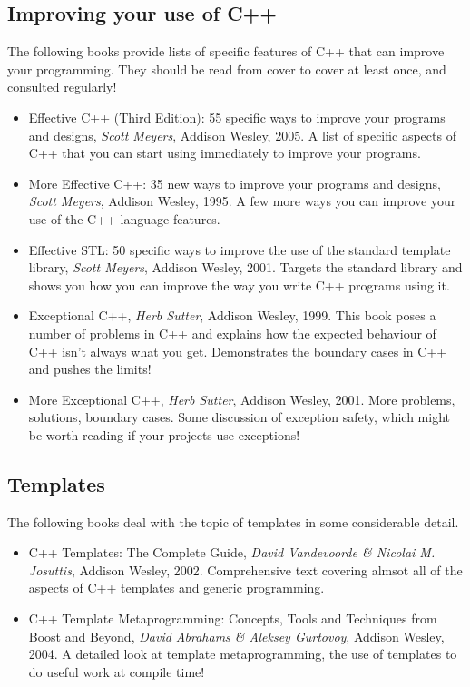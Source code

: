 \documentclass[a4paper]{scrartcl}
\begin{document}
\subsection{Improving your use of C++}
The following books provide lists of specific features of C++ that can improve your programming. They should be read from cover to cover at least once, and consulted regularly!

\begin{itemize}
	\item Effective C++ (Third Edition): 55 specific ways to improve your programs and designs, \emph{Scott Meyers}, Addison Wesley, 2005. A list of specific aspects of C++ that you can start using immediately to improve your programs.
	\item More Effective C++: 35 new ways to improve your programs and designs, \emph{Scott Meyers}, Addison Wesley, 1995. A few more ways you can improve your use of the C++ language features.
	\item Effective STL: 50 specific ways to improve the use of the standard template library, \emph{Scott Meyers}, Addison Wesley, 2001. Targets the standard library and shows you how you can improve the way you write C++ programs using it.
	\item Exceptional C++, \emph{Herb Sutter}, Addison Wesley, 1999. This book poses a number of problems in C++ and explains how the expected behaviour of C++ isn't always what you get. Demonstrates the boundary cases in C++ and pushes the limits!
	\item More Exceptional C++, \emph{Herb Sutter}, Addison Wesley, 2001. More problems, solutions, boundary cases. Some discussion of exception safety, which might be worth reading if your projects use exceptions!
\end{itemize}

\subsection{Templates}
The following books deal with the topic of templates in some considerable detail.

\begin{itemize}
	\item C++ Templates: The Complete Guide, \emph{David Vandevoorde \& Nicolai M. Josuttis}, Addison Wesley, 2002. Comprehensive text covering almsot all of the aspects of C++ templates and generic programming.
	\item C++ Template Metaprogramming: Concepts, Tools and Techniques from Boost and Beyond, \emph{David Abrahams \& Aleksey Gurtovoy}, Addison Wesley, 2004. A detailed look at template metaprogramming, the use of templates to do useful work at compile time!
\end{itemize}
\end{document}
